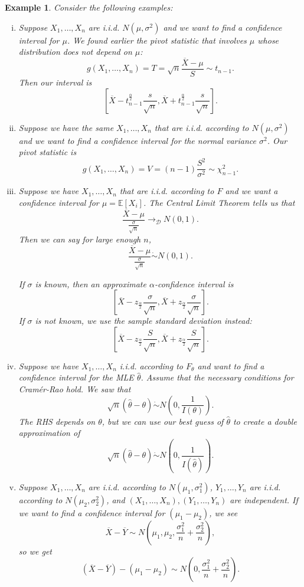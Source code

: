\documentclass{tufte-handout}
\newcommand*\E{\mathbb{E}}
\newtheorem{ex}[thm]{Example}
\theoremstyle{definition}
\begin{document}
\begin{ex}
	Consider the following examples:
	\begin{enumerate}[(i)]
		\item Suppose $X_1,\ldots,X_n$ are i.i.d. $N(\mu,\sigma^2)$ and we want to find a confidence interval for $\mu$. We found earlier the pivot statistic that involves $\mu$ whose distribution does not depend on $\mu$: \[
			g(X_1,\ldots,X_n) = T = \sqrt{n} \frac{\overline{X}-\mu}{S}\sim t_{n-1}
		.\] Then our interval is \[
			\left[ \overline{X} - t_{n-1}^{\frac{\alpha}{2}} \frac{s}{\sqrt{n} }, \overline{X} + t_{n-1}^{\frac{\alpha}{2}} \frac{s}{\sqrt{n} } \right] 
		.\] 
		\item Suppose we have the same $X_1,\ldots,X_n$ that are i.i.d. according to $N(\mu,\sigma^2)$ and we want to find a confidence interval for the normal variance $\sigma^2$. Our pivot statistic is \[
			g(X_1,\ldots,X_n) = V = (n-1) \frac{S^2}{\sigma^2} \sim  \chi^2_{n-1}
		.\]
		\item Suppose we have $X_1,\ldots,X_n$ that are i.i.d. according to $F$ and we want a confidence interval for $\mu = \E\left[X_i\right] $. The Central Limit Theorem tells us that \[
			\frac{\overline{X}-\mu}{\frac{\sigma}{\sqrt{n} }} \to_{\mathscr{D}} N(0,1)
		.\] Then we can say for large enough $n$, \[
			\frac{\overline{X}-\mu}{\frac{\sigma}{\sqrt{n} }} \dot{\sim} N(0,1)
		.\] 

		If $\sigma$ is known, then an approximate $\alpha$-confidence interval is \[
			\left[ \overline{X} - z_{\frac{\alpha}{2}}\frac{\sigma}{\sqrt{n} }, \overline{X} + z_{\frac{\alpha}{2}} \frac{\sigma}{\sqrt{n} } \right] 
		.\] If $\sigma$ is not known, we use the sample standard deviation instead: \[
			\left[ \overline{X} - z_{\frac{\alpha}{2}}\frac{S}{\sqrt{n} }, \overline{X} + z_{\frac{\alpha}{2}} \frac{S}{\sqrt{n} } \right] 
		.\]
		\item Suppose we have $X_1,\ldots,X_n$ i.i.d. according to $F_\theta$ and want to find a confidence interval for the MLE $\hat{\theta}$. Assume that the necessary conditions for Cram\'er-Rao hold. We saw that \[
				\sqrt{n} \left( \hat{\theta}-\theta \right) \dot{\sim} N\left(0,\frac{1}{I(\theta)}\right)
		.\] The RHS depends on $\theta$, but we can use our best guess of $\hat{\theta}$ to create a double approximation of \[
			\sqrt{n} (\hat{\theta}-\theta) \dot{\sim} N\left(0, \frac{1}{I(\hat{\theta})}\right)
		.\] 
	\item Suppose $X_1,\ldots,X_n$ are i.i.d. according to $N(\mu_1,\sigma_1^2)$, $Y_1,\ldots,Y_n$ are i.i.d. according to $N(\mu_2,\sigma_2^2)$, and $(X_1,\ldots,X_n),(Y_1,\ldots,Y_n)$ are independent. If we want to find a confidence interval for $(\mu_1-\mu_2)$, we see \[
		\overline{X}-\overline{Y} \sim  N\left( \mu_1,\mu_2, \frac{\sigma_1^2}{n} + \frac{\sigma_2^2}{n} \right)
	,\] so we get \[
		\left( \overline{X}-\overline{Y} \right) - (\mu_1-\mu_2) \sim N\left(0, \frac{\sigma_1^2}{n} + \frac{\sigma_2^2}{n}
		\right).\] 
	\end{enumerate}
\end{ex}
\end{document}
